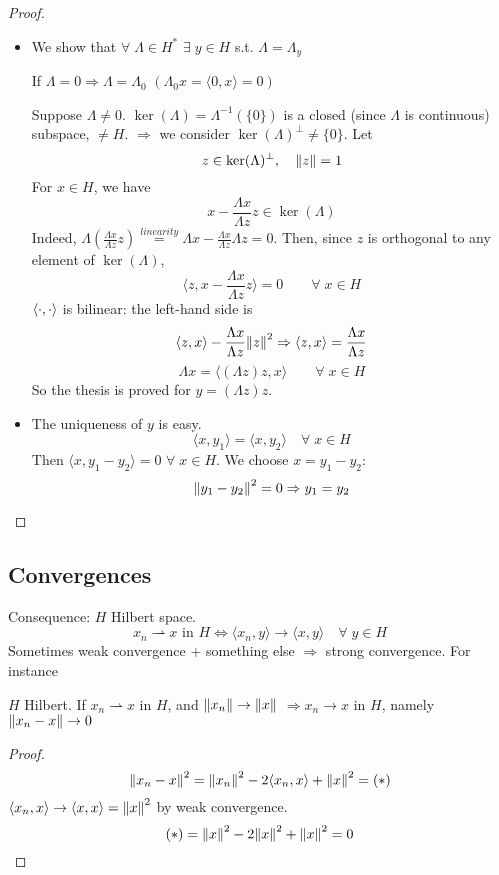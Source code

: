 \begin{proof}
    \begin{itemize}
        \item We show that \(\forall\; \Lambda \in H^* \) \(\exists\; y \in H\) s.t. \(\Lambda = \Lambda_y\)
        
        If \(\Lambda = 0 \Rightarrow \Lambda = \Lambda_0\) \((\Lambda_0 x = \langle 0, x\rangle   = 0)\)

        Suppose \(\Lambda \neq 0. \) \(\ker(\Lambda) = \Lambda^{-1}(\{0\}) \) is a closed (since \(\Lambda\) is continuous) subspace, \(\neq H\). \(\Rightarrow\) we consider \(\ker(\Lambda)^\perp \neq \{0\}\). Let
        \[
            z \in \ker(\Lambda)^\perp, \quad \norm{z}=1
        \]
        For \(x \in H\), we have
        \[
            x - \frac{\Lambda x}{\Lambda z} z \in \ker(\Lambda)
        \]
        Indeed, \(\Lambda \left( \frac{\Lambda x}{\Lambda z} z \right) \overset{linearity}{=} \Lambda x - \frac{\Lambda x}{\Lambda z} \Lambda z = 0\). Then, since \(z\) is orthogonal to any element of \(\ker(\Lambda)\), 
        \[
            \langle z, x - \frac{\Lambda x}{\Lambda z} z\rangle   = 0 \qquad \forall\; x \in H
        \] 
        \(\langle \cdot,\cdot \rangle  \) is bilinear: the left-hand side is 
        \[
            \langle z, x\rangle   - \frac{\Lambda x}{\Lambda z} \norm{z}^2 \Rightarrow \langle z, x\rangle   = \frac{\Lambda x}{\Lambda z} 
        \]
        \[
            \Lambda x = \langle (\Lambda z)z, x\rangle   \qquad \forall \; x \in H
        \]
        So the thesis is proved for \(y = (\Lambda z)z\).

        \item The uniqueness of \(y\) is easy.
        \[
            \langle x, y_1\rangle   = \langle x, y_2\rangle   \quad \forall \; x \in H
        \]
        Then \(\langle x, y_1-y_2\rangle   = 0\) \(\forall \; x \in H\). We choose \(x = y_1 -y_2\):
        \[
            \norm{y_1 - y_2}^2 = 0 \Rightarrow y_1 = y_2
        \]
    \end{itemize}
\end{proof}
\subsection{Convergences}
Consequence: \(H\) Hilbert space.
\[
    x_n \rightharpoonup x \text{ in } H \Leftrightarrow \langle x_n, y\rangle   \to \langle x, y\rangle   \quad \forall\; y \in H
\]
Sometimes weak convergence + something else \(\Rightarrow\) strong convergence. For instance
\begin{proposition}
    \(H\) Hilbert. If \(x_n \rightharpoonup x\)  in \(H\), and \(\norm{x_n} \to \norm{x}\) \(\Rightarrow x_n \to x\) in \(H\), namely \(\norm{x_n - x} \to 0\)
\end{proposition}
\begin{proof}
    \[
        \norm{x_n - x }^2 = \norm{x_n}^2 - 2 \langle x_n, x\rangle   + \norm{x}^2 = (*)
    \]
    \(\langle x_n, x\rangle   \to \langle x, x\rangle   = \norm{x}^2 \) by weak convergence.
    \[
        (*) = \norm{x}^2 - 2 \norm{x}^2 + \norm{x}^2 = 0
    \]
\end{proof}

